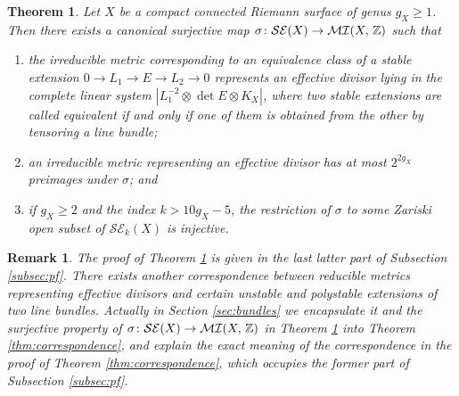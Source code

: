 \documentclass[12pt]{article}
\newtheorem{thm}{Theorem}[section]
\newtheorem{rem}{Remark}[section]
\begin{document}
\begin{thm}
\label{thm:corr}
Let $X$ be a compact connected Riemann surface of genus $g_X \geq 1$. Then there exists a canonical surjective map $\sigma \colon {\mathcal {SE}}(X)\to {\mathcal {MI}}(X,\,{\Bbb Z})$ such that
\begin{enumerate}

\item the irreducible metric corresponding to an equivalence class of a stable extension $0\to L_1\to E\to L_2\to 0$ represents an effective divisor lying  in the complete linear system $\left| L_1^{-2} \otimes \det E \otimes K_{X} \right|$, where two stable extensions are called {\rm equivalent} if and only if one of them is obtained from the other by tensoring a line bundle;


\item an irreducible metric representing an effective divisor has at most $2^{2g_{X}}$ preimages under $\sigma$; and

\item if $g_X \geq 2$ and the index $k >  10g_{X} - 5$, the restriction of $\sigma$ to some Zariski open subset of ${\mathcal {SE}}_k(X)$ is injective.
\end{enumerate}
\end{thm}

\begin{rem}
\label{rem:Gro}
{\rm The proof of Theorem \ref{thm:corr} is given in the last latter part of Subsection \ref{subsec:pf}. There exists another correspondence between reducible metrics representing effective divisors and certain unstable and polystable extensions of two line bundles. Actually in Section \ref{sec:bundles} we encapsulate it and the surjective property of $\sigma \colon {\mathcal {SE}}(X)\to {\mathcal {MI}}(X,\,{\Bbb Z})$  in  Theorem \ref{thm:corr} into Theorem \ref{thm:correspondence}, and explain the exact meaning of the correspondence in the proof of Theorem \ref{thm:correspondence}, which occupies the former part of  Subsection \ref{subsec:pf}.
}\end{rem}
\end{document}
